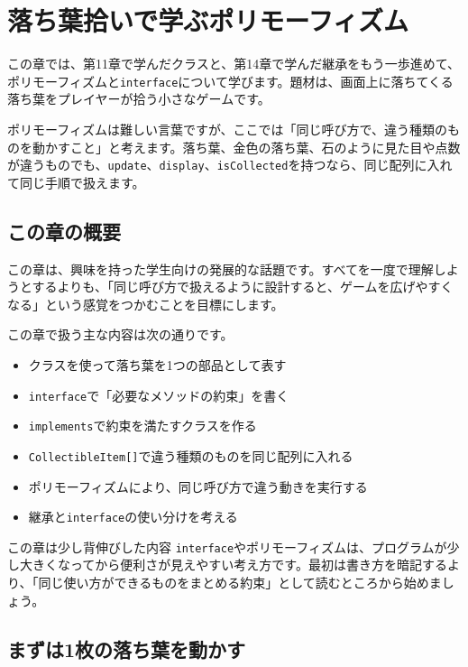\chapter{落ち葉拾いで学ぶポリモーフィズム}
\label{chap:polymorphism-leaf-collector}

この章では、第11章で学んだクラスと、第14章で学んだ継承をもう一歩進めて、ポリモーフィズムと\texttt{interface}について学びます。題材は、画面上に落ちてくる落ち葉をプレイヤーが拾う小さなゲームです。

ポリモーフィズムは難しい言葉ですが、ここでは「同じ呼び方で、違う種類のものを動かすこと」と考えます。落ち葉、金色の落ち葉、石のように見た目や点数が違うものでも、\texttt{update}、\texttt{display}、\texttt{isCollected}を持つなら、同じ配列に入れて同じ手順で扱えます。

\section{この章の概要}

この章は、興味を持った学生向けの発展的な話題です。すべてを一度で理解しようとするよりも、「同じ呼び方で扱えるように設計すると、ゲームを広げやすくなる」という感覚をつかむことを目標にします。

この章で扱う主な内容は次の通りです。

\begin{itemize}
    \item クラスを使って落ち葉を1つの部品として表す
    \item \texttt{interface}で「必要なメソッドの約束」を書く
    \item \texttt{implements}で約束を満たすクラスを作る
    \item \texttt{CollectibleItem[]}で違う種類のものを同じ配列に入れる
    \item ポリモーフィズムにより、同じ呼び方で違う動きを実行する
    \item 継承と\texttt{interface}の使い分けを考える
\end{itemize}

\begin{notebox}{この章は少し背伸びした内容}
\texttt{interface}やポリモーフィズムは、プログラムが少し大きくなってから便利さが見えやすい考え方です。最初は書き方を暗記するより、「同じ使い方ができるものをまとめる約束」として読むところから始めましょう。
\end{notebox}

\section{まずは1枚の落ち葉を動かす}

